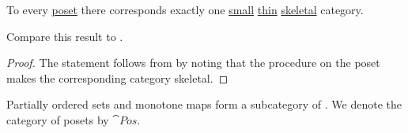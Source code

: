 \begin{proposition}\label{thm:partial_order_category_correspondence}
  To every \hyperref[def:poset]{poset} there corresponds exactly one \hyperref[def:category_cardinality]{small} \hyperref[def:thin_category]{thin} \hyperref[def:skeletal_category]{skeletal} category.

  Compare this result to .
\end{proposition}
\begin{proof}
  The statement follows from  by noting that the procedure  on the poset makes the corresponding category skeletal.
\end{proof}

\begin{definition}\label{def:category_of_posets}
  Partially ordered sets and monotone maps form a subcategory of . We denote the category of posets by \( \cat{Pos} \).
\end{definition}

